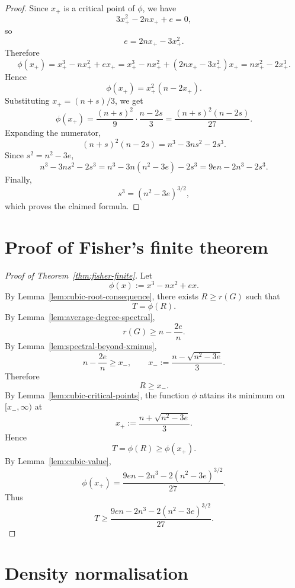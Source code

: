 \documentclass[11pt]{article}
\begin{document}
\begin{proof}
Since \(x_+\) is a critical point of \(\phi\), we have
\[
        3x_+^2-2nx_+ + e=0,
\]
so
\[
        e=2nx_+-3x_+^2.
\]
Therefore
\[
        \phi(x_+)
        =
        x_+^3-nx_+^2+ex_+
        =
        x_+^3-nx_+^2+(2nx_+-3x_+^2)x_+
        =
        nx_+^2-2x_+^3.
\]
Hence
\[
        \phi(x_+)=x_+^2(n-2x_+).
\]
Substituting \(x_+=(n+s)/3\), we get
\[
        \phi(x_+)
        =
        \frac{(n+s)^2}{9}\cdot \frac{n-2s}{3}
        =
        \frac{(n+s)^2(n-2s)}{27}.
\]
Expanding the numerator,
\[
        (n+s)^2(n-2s)
        =
        n^3-3ns^2-2s^3.
\]
Since \(s^2=n^2-3e\),
\[
        n^3-3ns^2-2s^3
        =
        n^3-3n(n^2-3e)-2s^3
        =
        9en-2n^3-2s^3.
\]
Finally,
\[
        s^3=(n^2-3e)^{3/2},
\]
which proves the claimed formula.
\end{proof}

\section{Proof of Fisher's finite theorem}

\begin{proof}[Proof of Theorem~\ref{thm:fisher-finite}]
Let
\[
        \phi(x):=x^3-nx^2+ex.
\]
By Lemma~\ref{lem:cubic-root-consequence}, there exists \(R\ge r(G)\) such that
\[
        T=\phi(R).
\]
By Lemma~\ref{lem:average-degree-spectral},
\[
        r(G)\ge n-\frac{2e}{n}.
\]
By Lemma~\ref{lem:spectral-beyond-xminus},
\[
        n-\frac{2e}{n}\ge x_-,
        \qquad
        x_-:=\frac{n-\sqrt{n^2-3e}}{3}.
\]
Therefore
\[
        R\ge x_-.
\]
By Lemma~\ref{lem:cubic-critical-points}, the function \(\phi\) attains its minimum
on \([x_-,\infty)\) at
\[
        x_+:=\frac{n+\sqrt{n^2-3e}}{3}.
\]
Hence
\[
        T=\phi(R)\ge \phi(x_+).
\]
By Lemma~\ref{lem:cubic-value},
\[
        \phi(x_+)
        =
        \frac{9en-2n^3-2(n^2-3e)^{3/2}}{27}.
\]
Thus
\[
        T
        \ge
        \frac{9en-2n^3-2(n^2-3e)^{3/2}}{27}.
\]
\end{proof}

\section{Density normalisation}
\end{document}
